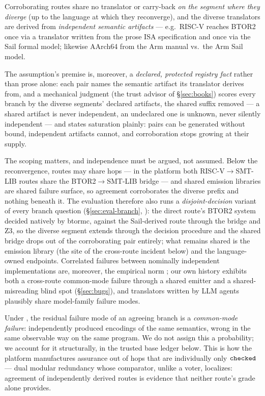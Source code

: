 \begin{assumption}[Diversity]
\label{asm:diversity}
Corroborating routes share no translator or carry-back \emph{on the
segment where they diverge} (up to the language at which they
reconverge), and the diverse translators are derived from
\emph{independent semantic artifacts} --- e.g.\ RISC-V reaches BTOR2
once via a translator written from the prose ISA specification and once
via the Sail formal model; likewise AArch64 from the Arm manual vs.\ the
Arm Sail model.
\end{assumption}

\ifarxiv
The assumption's premise is, moreover, a \emph{declared,
protected registry fact} rather than prose alone: each pair names the
semantic artifact its translator derives from, and a mechanical
judgment (the trust advisor of \S\ref{sec:books}) scores every branch
by the diverse segments' declared artifacts, the shared suffix
removed --- a shared artifact is never independent, an undeclared one
is unknown, never silently independent --- and states saturation
plainly: pairs can be generated without bound, independent artifacts
cannot, and corroboration stops growing at their supply.
\fi

The scoping matters, and independence must be argued, not assumed. Below
the reconvergence, routes may share hops --- in the platform both
RISC-V$\to$SMT-LIB routes share the BTOR2$\to$SMT-LIB bridge --- and
shared emission libraries are shared failure surface, so agreement
corroborates the diverse prefix and nothing beneath it. The evaluation
therefore also runs a \emph{disjoint-decision} variant of every branch
question (\S\ref{sec:eval-branch}, ): the direct route's BTOR2 system
decided natively by btormc, against the Sail-derived route through the
bridge and Z3, so the diverse segment extends through the decision
procedure and the shared bridge drops out of the corroborating pair
entirely; what remains shared is the emission library (the site of the
cross-route incident below) and the language-owned endpoints. Correlated
failures between nominally independent implementations are, moreover,
the empirical norm \citep{knight1986independence}; our own history
exhibits both a cross-route common-mode failure through a shared emitter
and a shared-misreading blind spot (\S\ref{sec:bugs}), and translators
written by LLM agents plausibly share model-family failure modes.

Under , the residual failure mode of an agreeing
branch is a \emph{common-mode failure}: independently produced encodings
of the same semantics, wrong in the same observable way on the same
program. We do not assign this a probability; we account for it
structurally, in the trusted base ledger below. This is how the platform
manufactures assurance out of hops that are individually only
$\mathtt{checked}$ --- dual modular redundancy whose comparator, unlike a voter,
localizes: agreement of independently derived routes is evidence that
neither route's grade alone provides.

